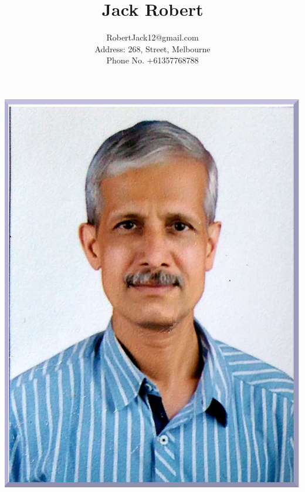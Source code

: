 \documentclass[10pt]{article}
\begin{document}
  
      
    \title{\bfseries\Huge Jack Robert}  
    \author{
    RobertJack12@gmail.com\\ Address: 268, Street, Melbourne \\ Phone No. +61357768788}  
    \date{}  
    \begin{minipage}{0.70\textwidth}  
    \begingroup  
    \let\center\flushleft   
    \let\endcenter\endflushleft  
    \maketitle  
    \endgroup  
    \end{minipage} %
    \begin{minipage}{0.27\textwidth}  
   \includegraphics[scale=0.05]{MyPhoto.jpg}  
    \end{minipage}  
      
\end{document}
